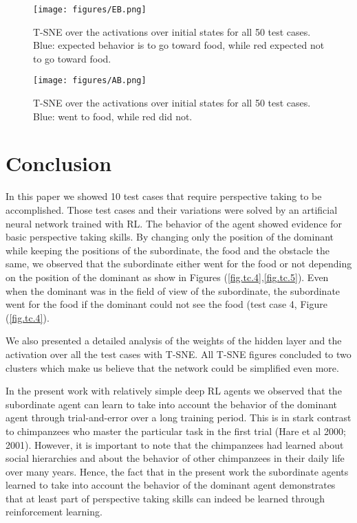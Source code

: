 \documentclass{article}
\begin{document}
\begin{figure}[H]
\texttt{[image: figures/EB.png]}
\caption{T-SNE over the activations over initial states for all 50 test cases. Blue: expected behavior is to go toward food, while red expected not to go toward food.}
\label{fig.expected.behavior}
\end{figure}
\begin{figure}[H]
\texttt{[image: figures/AB.png]}
\caption{T-SNE over the activations over initial states for all 50 test cases. Blue: went  to food, while red did not.}
\label{fig.actual.behavior}
\end{figure}

\section{Conclusion}
In this paper we showed 10 test cases that require perspective taking to be accomplished. Those test cases and their variations were solved by an artificial neural network trained with RL. The behavior of the agent showed evidence for basic perspective taking skills. By changing only the position of the dominant while keeping the positions of the subordinate, the food and the obstacle the same, we observed that the subordinate either went for the food or not depending on the position of the dominant as show in Figures (\ref{fig.tc.4},\ref{fig.tc.5}). Even when the dominant was in the field of view of the subordinate, the subordinate went for the food if the dominant could not see the food (test case 4, Figure (\ref{fig.tc.4}).  

We also presented a detailed analysis of the weights of the hidden layer and the activation over all the test cases with T-SNE. All T-SNE figures concluded to two clusters which make us believe that the network could be simplified even more. 

In the present work with relatively simple deep RL agents we observed that the subordinate agent can learn to take into account the behavior of the dominant agent through trial-and-error over a long training period. This is in stark contrast to chimpanzees who master the particular task in the first trial  (Hare et al 2000; 2001). However, it is important to note that the chimpanzees had learned about social hierarchies and about the behavior of other chimpanzees in their daily life over many years. Hence, the fact that in the present work the subordinate agents learned to take into account the behavior of the dominant agent demonstrates that at least part of perspective taking skills can indeed be learned through reinforcement learning. 
\end{document}

